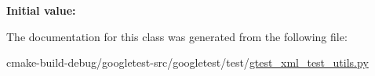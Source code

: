 {\bfseries Initial value\+:}
\begin{DoxyCode}{0}
\DoxyCodeLine{=  \{}
\DoxyCodeLine{      \textcolor{stringliteral}{'testsuites'}: \textcolor{stringliteral}{'name'},}
\DoxyCodeLine{      \textcolor{stringliteral}{'testsuite'}: \textcolor{stringliteral}{'name'},}
\DoxyCodeLine{      \textcolor{stringliteral}{'testcase'}: \textcolor{stringliteral}{'name'},}
\DoxyCodeLine{      \textcolor{stringliteral}{'failure'}: \textcolor{stringliteral}{'message'},}
\DoxyCodeLine{      \textcolor{stringliteral}{'property'}: \textcolor{stringliteral}{'name'},}
\DoxyCodeLine{  \}}

\end{DoxyCode}


The documentation for this class was generated from the following file\+:\begin{DoxyCompactItemize}
\item 
cmake-\/build-\/debug/googletest-\/src/googletest/test/\mbox{\hyperlink{gtest__xml__test__utils_8py}{gtest\+\_\+xml\+\_\+test\+\_\+utils.\+py}}\end{DoxyCompactItemize}
